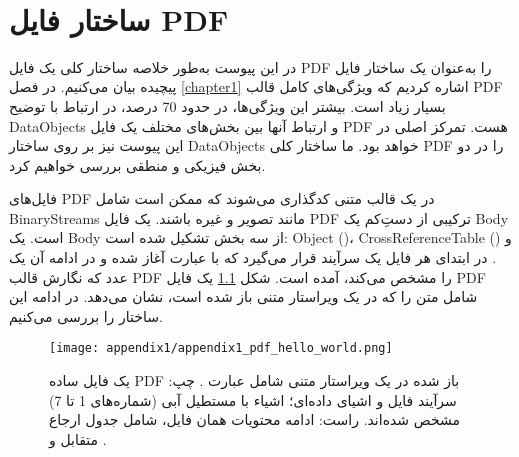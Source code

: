 {
    \protect\renewcommand\protect\cftchappresnum{\appendixname~}%
    \protect\setlength{\cftchapnumwidth}{\mylenapp}
}%
    
\chapter{ساختار فایل PDF}\label{appendix:1}
\thispagestyle{empty}

در این پیوست به‌طور خلاصه ساختار کلی یک فایل \gls{PDF}
 را به‌عنوان یک ساختار فایل پیچیده بیان می‌کنیم. در فصل \ref{chapter1} اشاره کردیم که ویژگی‌های کامل قالب \gls{PDF}
  بسیار زیاد است. بیشتر این ویژگی‌ها، در حدود 70 درصد، در ارتباط با توضیح \glspl{DataObject} و ارتباط آنها بین بخش‌های مختلف یک فایل \gls{PDF}
   هست. تمرکز اصلی در این پیوست نیز بر روی ساختار \glspl{DataObject} خواهد بود. ما ساختار کلی \gls{PDF} را در دو بخش فیزیکی و منطقی بررسی خواهیم کرد.

فایل‌های \gls{PDF}
 در یک قالب متنی کدگذاری می‌شوند که ممکن است شامل \glspl{BinaryStream} مانند تصویر و غیره باشند. یک فایل \gls{PDF}
 ترکیبی از دست‌ِکم یک \gls{Body} است. یک \gls{Body} از سه بخش تشکیل شده است:  \gls{Object} ()، \gls{CrossReferenceTable} ()  و . در ابتدای هر فایل یک سرآیند قرار می‌گیرد که با عبارت  آغاز شده و در ادامه آن یک عدد که نگارش قالب \gls{PDF}
 را مشخص می‌کند، آمده است. ‏شکل \ref{appendix1_pdf_hello_world.png} یک فایل \gls{PDF}
  شامل متن   را که در یک ویراستار متنی باز شده است، نشان می‌دهد. در ادامه این ساختار را بررسی می‌کنیم.



\begin{figure}%
	\centering
	\texttt{[image: appendix1/appendix1\_pdf\_hello\_world.png]}
	\caption[ یک فایل \gls*{PDF}  باز شده در یک ویراستار متنی شامل عبارت ]
	{
		یک فایل ساده \gls*{PDF} باز شده در یک ویراستار متنی شامل عبارت . چپ: سرآیند فایل و اشیای داده‌ای؛ اشیاء با مستطیل آبی (شماره‌های 1 تا 7) مشخص شده‌اند. راست: ادامه محتویات همان فایل، شامل جدول ارجاع متقابل و .
	}
	\label{appendix1_pdf_hello_world.png}
\end{figure}


